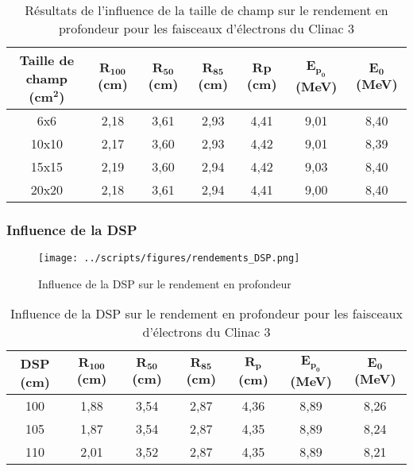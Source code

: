 \documentclass{article}
\begin{document}
\begin{table}[h]
  \centering
  \begin{tabular}{ccccccc}
  \toprule
  \textbf{Taille de champ} \textbf{(cm}$\mathbf{^2}$\textbf{)} & $\mathbf{R_{100}}$ \textbf{(cm)} & $\mathbf{R_{50}}$ \textbf{(cm)} & $\mathbf{R_{85}}$ \textbf{(cm)} & $\mathbf{Rp}$\textbf{(cm)} & $\mathbf{E_{p_0}}$ \textbf{(MeV)} & $\mathbf{E_0}$ \textbf{(MeV)} \\ \toprule
  6x6 & 2,18 & 3,61 & 2,93 & 4,41 & 9,01 & 8,40 \\
  10x10 & 2,17 & 3,60 & 2,93 & 4,42 & 9,01 & 8,39 \\
  15x15 & 2,19 & 3,60 & 2,94 & 4,42 & 9,03 & 8,40 \\
  20x20 & 2,18 & 3,61 & 2,94 & 4,41 & 9,00 & 8,40 \\ \bottomrule
  \end{tabular}
  \caption{Résultats de l'influence de la taille de champ sur le rendement en profondeur pour les faisceaux d'électrons du Clinac 3}
  \label{table_rdt_champs}
\end{table}

\subsubsection{Influence de la DSP}


\begin{figure}[h!]
  \centering
  \texttt{[image: ../scripts/figures/rendements\_DSP.png]}
  \caption{Influence de la DSP sur le rendement en profondeur}
  \label{fig_rdt_DSP}
\end{figure}

\begin{table}[h]
  \centering
  \begin{tabular}{ccccccc}
    \toprule
    \textbf{DSP (cm)} & $\mathbf{R_{100}}$ \textbf{(cm)} & $\mathbf{R_{50}}$ \textbf{(cm)} & $\mathbf{R_{85}}$ \textbf{(cm)} & $\mathbf{R_p}$\textbf{(cm)} & $\mathbf{E_{p_0}}$ \textbf{(MeV)} & $\mathbf{E_0}$ \textbf{(MeV)} \\ \toprule
    100 & 1,88 & 3,54 & 2,87 & 4,36 & 8,89 & 8,26 \\
    105 & 1,87 & 3,54 & 2,87 & 4,35 & 8,89 & 8,24 \\
    110 & 2,01 & 3,52 & 2,87 & 4,35 & 8,89 & 8,21 \\ \bottomrule
  \end{tabular}
  \caption{Influence de la DSP sur le rendement en profondeur pour les faisceaux d'électrons du Clinac 3}
  \label{table_rdt_dsp}
\end{table}
\end{document}

